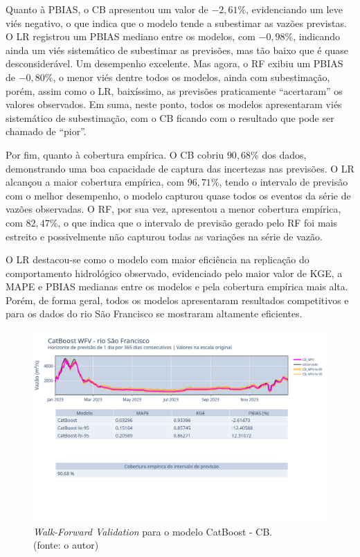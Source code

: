 Quanto à PBIAS, o CB apresentou um valor de $-2,61\%$, evidenciando um leve viés negativo, o que indica que o modelo tende a subestimar as vazões previstas. O LR registrou um PBIAS mediano entre os modelos, com $-0,98\%$, indicando ainda um viés sistemático de subestimar as previsões, mas tão baixo que é quase desconsiderável. Um desempenho excelente. Mas agora, o RF exibiu um PBIAS de $-0,80\%$, o menor viés dentre todos os modelos, ainda com subestimação, porém, assim como o LR, baixíssimo, as previsões praticamente ``acertaram'' os valores observados. Em suma, neste ponto, todos os modelos apresentaram viés sistemático de subestimação, com o CB ficando com o resultado que pode ser chamado de ``pior''.

Por fim, quanto à cobertura empírica. O CB cobriu $90,68\%$ dos dados, demonstrando uma boa capacidade de captura das incertezas nas previsões. O LR alcançou a maior cobertura empírica, com $96,71\%$, tendo o intervalo de previsão com o melhor desempenho, o modelo capturou quase todos os eventos da série de vazões observadas. O RF, por sua vez, apresentou a menor cobertura empírica, com $82,47\%$, o que indica que o intervalo de previsão gerado pelo RF foi mais estreito e possivelmente não capturou todas as variações na série de vazão.

O LR destacou-se como o modelo com maior eficiência na replicação do comportamento hidrológico observado, evidenciado pelo maior valor de KGE, a MAPE e PBIAS medianas entre os modelos e pela cobertura empírica mais alta. Porém, de forma geral, todos os modelos apresentaram resultados competitivos e para os dados do rio São Francisco se mostraram altamente eficientes.

\begin{figure}[!h]
	\centering
	\includegraphics[scale=0.33]{Figuras/rio_sao_francisco/wfv/CB/CB_WFV_ORIG.png}
	\caption{\textit{Walk-Forward Validation} para o modelo CatBoost - CB.\\(fonte: o autor)}
	\label{fig:francisco_CB_WFV_ORIG}
\end{figure}

